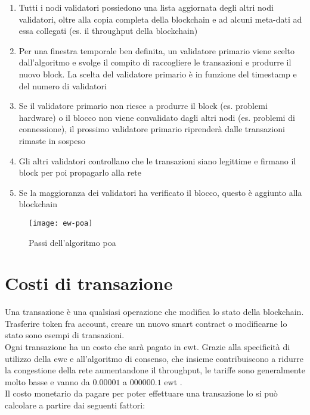 \begin{enumerate}
    \item Tutti i nodi validatori possiedono una lista aggiornata degli altri nodi validatori, oltre alla copia completa della blockchain e ad alcuni meta-dati ad essa collegati (es. il throughput della blockchain)
    \item Per una finestra temporale ben definita, un validatore primario viene scelto dall'algoritmo e svolge il compito di raccogliere le transazioni e produrre il nuovo block. La scelta del validatore primario è in funzione del timestamp e del numero di validatori
    \item Se il validatore primario non riesce a produrre il block (es. problemi hardware) o il blocco non viene convalidato dagli altri nodi (es. problemi di connessione), il prossimo validatore primario riprenderà dalle transazioni rimaste in sospeso
    \item Gli altri validatori controllano che le transazioni siano legittime e firmano il block per poi propagarlo alla rete
    \item Se la maggioranza dei validatori ha verificato il blocco, questo è aggiunto alla blockchain
\end{enumerate}


\begin{figure}[h]
    \texttt{[image: ew-poa]}
    \centering
    \caption{Passi dell'algoritmo \gls{poa} \cite{img:ew-poa}}
    \label{lab:ew-poa}
\end{figure}


\section{Costi di transazione}
Una transazione è una qualsiasi operazione che modifica lo stato della blockchain. Trasferire token fra account, creare un nuovo smart contract o modificarne lo stato sono esempi di transazioni. \\
Ogni transazione ha un costo che sarà pagato in \gls{ewt}.
Grazie alla specificità di utilizzo della \gls{ewc} e all'algoritmo di consenso, che insieme contribuiscono a ridurre la congestione della rete aumentandone il throughput, 
le tariffe sono generalmente molto basse e vanno da $0.00001$ a $000000.1$ \gls{ewt} \cite{art:manage-costs}. \\
Il costo monetario da pagare per poter effettuare una transazione lo si può calcolare a partire dai seguenti fattori:


